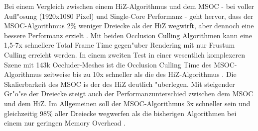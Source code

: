 \documentclass[journal]{vgtc}
\begin{document}
Bei einem Vergleich zwischen einem HiZ-Algorithmus und dem MSOC - bei voller Aufl"osung (1920x1080 Pixel) und Single-Core Performanz - geht hervor, dass der MSOC-Algorithmus 2\% weniger Dreiecke als der HiZ wegwirft, aber dennoch eine bessere Performanz erzielt \cite{MSOC}. Mit beiden Occlusion Culling Algorithmen kann eine 1,5-7x schnellere Total Frame Time gegen"uber Rendering mit nur Frustum Culling erreicht werden. In einem zweiten Test in einer wesentlich komplexeren Szene mit 143k Occluder-Meshes ist die Occlusion Culling Time des MSOC-Algorithmus zeitweise bis zu 10x schneller als die des HiZ-Algorithmus \cite{MSOC}. Die Skalierbarkeit des MSOC is der des HiZ deutlich "uberlegen. Mit steigender Gr"o"se der Dreiecke steigt auch der Performanzunterschied zwischen dem MSOC und dem HiZ. Im Allgemeinen soll der MSOC-Algorithmus 3x schneller sein und gleichzeitig 98\% aller Dreiecke wegwerfen als die bisherigen Algorithmen bei einem nur geringen Memory Overhead \cite{MSOC}.
\end{document}
